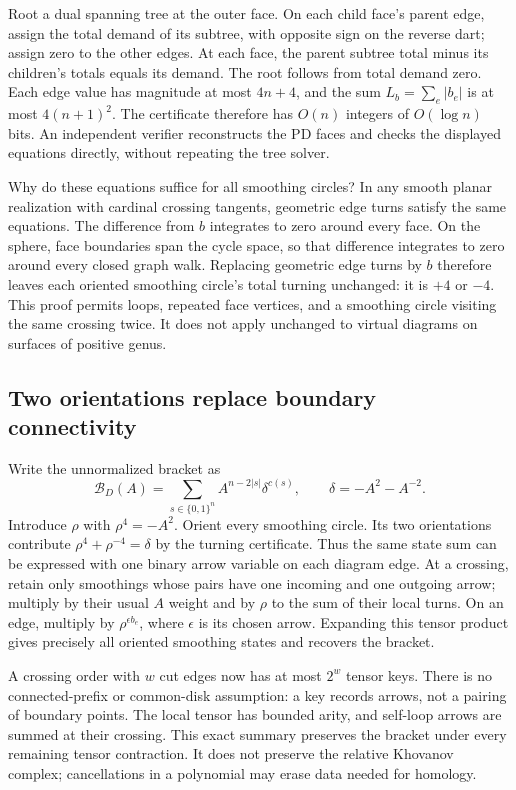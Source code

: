 Root a dual spanning tree at the outer face. On each child face's parent
edge, assign the total demand of its subtree, with opposite sign on the
reverse dart; assign zero to the other edges. At each face, the parent
subtree total minus its children's totals equals its demand. The root
follows from total demand zero. Each edge value has magnitude at most
$4n+4$, and the sum $L_b=\sum_e|b_e|$ is at most $4(n+1)^2$.
The certificate therefore has $O(n)$ integers of $O(\log n)$ bits.
An independent verifier reconstructs the PD faces and checks the displayed
equations directly, without repeating the tree solver.

Why do these equations suffice for all smoothing circles? In any smooth
planar realization with cardinal crossing tangents, geometric edge turns
satisfy the same equations. The difference from $b$ integrates to zero
around every face. On the sphere, face boundaries span the cycle space,
so that difference integrates to zero around every closed graph walk.
Replacing geometric edge turns by $b$ therefore leaves each oriented
smoothing circle's total turning unchanged: it is $+4$ or $-4$.
This proof permits loops, repeated face vertices, and a smoothing circle
visiting the same crossing twice. It does not apply unchanged to virtual
diagrams on surfaces of positive genus.

\subsection{Two orientations replace boundary connectivity}
Write the unnormalized bracket as
\[
 \mathcal B_D(A)=\sum_{s\in\{0,1\}^n}A^{n-2|s|}\delta^{c(s)},
 \qquad \delta=-A^2-A^{-2}.
\]
Introduce $\rho$ with $\rho^4=-A^2$. Orient every smoothing circle.
Its two orientations contribute $\rho^4+\rho^{-4}=\delta$ by the turning
certificate. Thus the same state sum can be expressed with one binary
arrow variable on each diagram edge. At a crossing, retain only smoothings
whose pairs have one incoming and one outgoing arrow; multiply by their
usual $A$ weight and by $\rho$ to the sum of their local turns. On an edge,
multiply by $\rho^{\epsilon b_e}$, where $\epsilon$ is its chosen arrow.
Expanding this tensor product gives precisely all oriented smoothing
states and recovers the bracket.

A crossing order with $w$ cut edges now has at most $2^w$ tensor keys.
There is no connected-prefix or common-disk assumption: a key records
arrows, not a pairing of boundary points. The local tensor has bounded
arity, and self-loop arrows are summed at their crossing. This exact
summary preserves the bracket under every remaining tensor contraction.
It does not preserve the relative Khovanov complex; cancellations in a
polynomial may erase data needed for homology.

